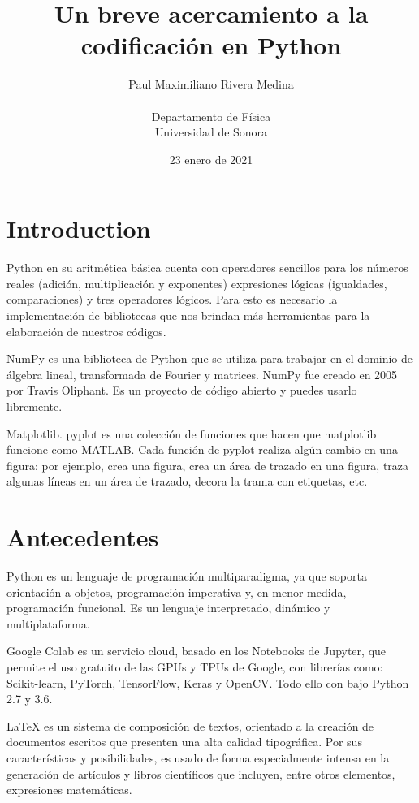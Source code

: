 \documentclass{report}
\title{Un breve acercamiento a la codificación en Python}
\author{Paul Maximiliano Rivera Medina\\
    \\
    Departamento de Física \\
    Universidad de Sonora}
\date{23 enero de 2021}
\begin{document}
\maketitle

\section{Introduction}
Python en su aritmética básica cuenta con operadores sencillos para los números reales (adición, multiplicación y exponentes) expresiones lógicas (igualdades, comparaciones) y tres operadores lógicos.
Para esto es necesario la implementación de bibliotecas que nos brindan más herramientas para la elaboración de nuestros códigos.

NumPy es una biblioteca de Python que se utiliza para trabajar en el dominio de álgebra lineal, transformada de Fourier y matrices. NumPy fue creado en 2005 por Travis Oliphant. Es un proyecto de código abierto y puedes usarlo libremente.

Matplotlib. pyplot es una colección de funciones que hacen que matplotlib funcione como MATLAB. Cada función de pyplot realiza algún cambio en una figura: por ejemplo, crea una figura, crea un área de trazado en una figura, traza algunas líneas en un área de trazado, decora la trama con etiquetas, etc.


\section{Antecedentes}
Python es un lenguaje de programación multiparadigma, ya que soporta orientación a objetos, programación imperativa y, en menor medida, programación funcional. Es un lenguaje interpretado, dinámico y multiplataforma.

Google Colab es un servicio cloud, basado en los Notebooks de Jupyter, que permite el uso gratuito de las GPUs y TPUs de Google, con librerías como: Scikit-learn, PyTorch, TensorFlow, Keras y OpenCV. Todo ello con bajo Python 2.7 y 3.6.

LaTeX es un sistema de composición de textos, orientado a la creación de documentos escritos que presenten una alta calidad tipográfica. Por sus características y posibilidades, es usado de forma especialmente intensa en la generación de artículos y libros científicos que incluyen, entre otros elementos, expresiones matemáticas.
\end{document}
